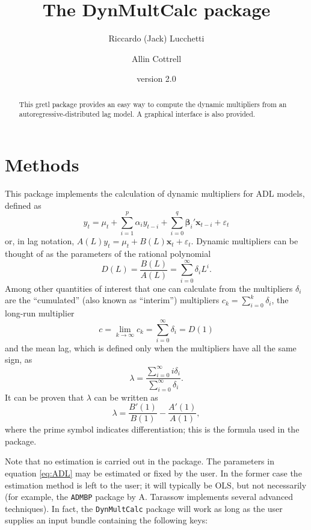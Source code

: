 \documentclass[a4paper,10pt]{article}
\author{Riccardo (Jack) Lucchetti \and Allin Cottrell}
\date{version 2.0}
\title{The \textsf{DynMultCalc} package}
\newcommand{\eps}{\varepsilon}
\newcommand{\xb}{\mathbf{x}}
\newcommand{\bb}{\boldsymbol{\beta}}
\begin{document}
\maketitle

\begin{abstract}
  This gretl package provides an easy way to compute the dynamic
  multipliers from an autoregressive-distributed lag model. A
  graphical interface is also provided.
\end{abstract}

\section{Methods}

This package implements the calculation of dynamic multipliers for ADL
models, defined as
\begin{equation}
  \label{eq:ADL}
  y_t = \mu_t + \sum_{i=1}^p \alpha_i y_{t-i} + \sum_{i=0}^q
  \bb_i' \xb_{t-i} + \eps_t
\end{equation}
or, in lag notation, $A(L) y_t = \mu_t + B(L) \xb_t + \eps_t$.
Dynamic multipliers can be thought of as the parameters of the
rational polynomial
\begin{equation}
  \label{eq:DynMult}
  D(L) = \frac{B(L)}{A(L)} = \sum_{i=0}^{\infty} \delta_i L^i .
\end{equation}
Among other quantities of interest that one can calculate from the
multipliers $\delta_i$ are the ``cumulated'' (also known as
``interim'') multipliers $ c_k = \sum_{i=0}^k \delta_i$, the long-run
multiplier
\[
  c = \lim_{k \to \infty} c_k = \sum_{i=0}^{\infty} \delta_i = D(1)
\]
and the mean lag, which is defined only when the multipliers have all
the same sign, as
\[
  \lambda = \frac{\sum_{i=0}^{\infty} i \delta_i}{\sum_{i=0}^{\infty} \delta_i}.
\]
It can be proven that $\lambda$ can be written as
\[
  \lambda = \frac{B'(1)}{B(1)} - \frac{A'(1)}{A(1)}, 
\]
where the prime symbol indicates differentiation; this is the formula
used in the package.

Note that no estimation is carried out in the package. The parameters
in equation \eqref{eq:ADL} may be estimated or fixed by the user. In
the former case the estimation method is left to the user; it will
typically be OLS, but not necessarily (for example, the \texttt{ADMBP}
package by A. Tarassow implements several advanced techniques). In
fact, the \texttt{DynMultCalc} package will work as long as the user
supplies an input bundle containing the following keys:
\end{document}
